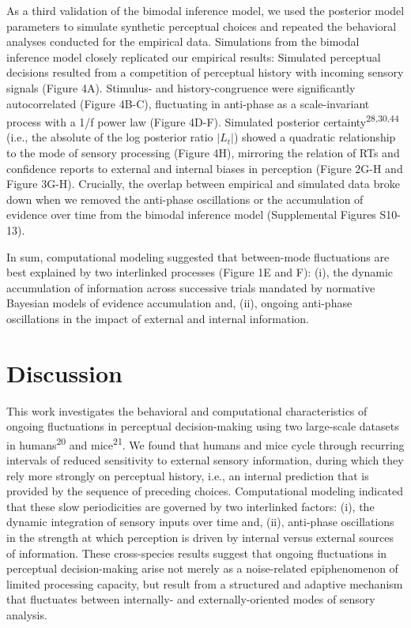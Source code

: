 \documentclass[
]{article}
\begin{document}
As a third validation of the bimodal inference model, we used the
posterior model parameters to simulate synthetic perceptual choices and
repeated the behavioral analyses conducted for the empirical data.
Simulations from the bimodal inference model closely replicated our
empirical results: Simulated perceptual decisions resulted from a
competition of perceptual history with incoming sensory signals (Figure
4A). Stimulus- and history-congruence were significantly autocorrelated
(Figure 4B-C), fluctuating in anti-phase as a scale-invariant process
with a 1/f power law (Figure 4D-F). Simulated posterior
certainty\textsuperscript{28,30,44} (i.e., the absolute of the log
posterior ratio \(|L_t|\)) showed a quadratic relationship to the mode
of sensory processing (Figure 4H), mirroring the relation of RTs and
confidence reports to external and internal biases in perception (Figure
2G-H and Figure 3G-H). Crucially, the overlap between empirical and
simulated data broke down when we removed the anti-phase oscillations or
the accumulation of evidence over time from the bimodal inference model
(Supplemental Figures S10-13).

In sum, computational modeling suggested that between-mode fluctuations
are best explained by two interlinked processes (Figure 1E and F): (i),
the dynamic accumulation of information across successive trials
mandated by normative Bayesian models of evidence accumulation and,
(ii), ongoing anti-phase oscillations in the impact of external and
internal information.

\hypertarget{discussion}{%
\section{Discussion}\label{discussion}}

This work investigates the behavioral and computational characteristics
of ongoing fluctuations in perceptual decision-making using two
large-scale datasets in humans\textsuperscript{20} and
mice\textsuperscript{21}. We found that humans and mice cycle through
recurring intervals of reduced sensitivity to external sensory
information, during which they rely more strongly on perceptual history,
i.e., an internal prediction that is provided by the sequence of
preceding choices. Computational modeling indicated that these slow
periodicities are governed by two interlinked factors: (i), the dynamic
integration of sensory inputs over time and, (ii), anti-phase
oscillations in the strength at which perception is driven by internal
versus external sources of information. These cross-species results
suggest that ongoing fluctuations in perceptual decision-making arise
not merely as a noise-related epiphenomenon of limited processing
capacity, but result from a structured and adaptive mechanism that
fluctuates between internally- and externally-oriented modes of sensory
analysis.
\end{document}
